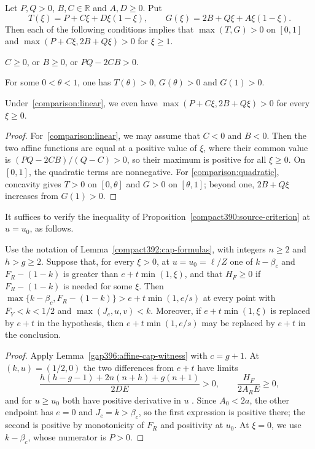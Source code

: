 \begin{lemma}
\label{cap394:affine-overlap}
Let $P,Q>0$, $B,C\in\mathbb R$ and $A,D\ge0$. Put
\[
 T(\xi)=P+C\xi+D\xi(1-\xi),\qquad
 G(\xi)=2B+Q\xi+A\xi(1-\xi).
\]
Then each of the following conditions implies that $\max(T,G)>0$ on $[0,1]$
and $\max(P+C\xi,2B+Q\xi)>0$ for $\xi\ge1$.
\begin{props}
\item\label{comparison:linear}
$C\ge0$, or $B\ge0$, or $PQ-2CB>0$.
\item\label{comparison:quadratic}
For some $0<\theta<1$, one has $T(\theta)>0$, $G(\theta)>0$
and $G(1)>0$.
\end{props}
Under~\ref{comparison:linear}, we even have $\max(P+C\xi,2B+Q\xi)>0$ for every $\xi\ge0$.
\end{lemma}
\begin{proof}
For~\ref{comparison:linear}, we may assume that $C<0$ and $B<0$.
Then the two affine functions are equal at a positive value of $\xi$, where their
common value is $(PQ-2CB)/(Q-C)>0$, so their maximum is positive for all $\xi\ge0$.
On $[0,1]$, the quadratic terms are nonnegative.
For \ref{comparison:quadratic}, concavity gives $T>0$ on
$[0,\theta]$ and $G>0$ on $[\theta,1]$; beyond one,
$2B+Q\xi$ increases from $G(1)>0$.
\end{proof}

It suffices to verify the inequality of Proposition~\ref{compact390:source-criterion} at $u=u_0$, as follows.

\begin{lemma}
\label{compact390:cap-propagation}
Use the notation of Lemma~\ref{compact392:cap-formulas},
with integers $n\ge2$ and $h>g\ge2$.
Suppose that, for every $\xi>0$, at $u=u_0=\ell/Z$ one of $k-\beta_c$ and $F_R-(1-k)$
is greater than $e+t\min(1,\xi)$, and that $H_F\ge0$ if $F_R-(1-k)$ is needed for some $\xi$.
Then $\max\{k-\beta_c,F_R-(1-k)\}>e+t\min(1,e/s)$ at every point with
$F_Y<k<1/2$ and $\max(J_c,u,v)<k$.
Moreover, if $e+t\min(1,\xi)$ is replaced by $e+t$ in the hypothesis, then $e+t\min(1,e/s)$ may be replaced by $e+t$ in the conclusion.
\end{lemma}
\begin{proof}
Apply Lemma~\ref{gap396:affine-cap-witness} with $c=g+1$.
At $(k,u)=(1/2,0)$ the two differences from $e+t$ have limits
\[
 \frac{h(h-g-1)+2n(n+h)+g(n+1)}{2DE}>0,
 \qquad \frac{H_F}{2A_RE}\ge0,
\]
and for $u\ge u_0$ both have positive derivative in $u$ .
Since $A_0<2a$, the other endpoint has $e=0$ and $J_c=k>\beta_c$, so
the first expression is positive there; the second is
positive by monotonicity of $F_R$ and positivity at $u_0$.
At $\xi=0$, we use $k-\beta_c$, whose numerator is $P>0$.
\end{proof}

